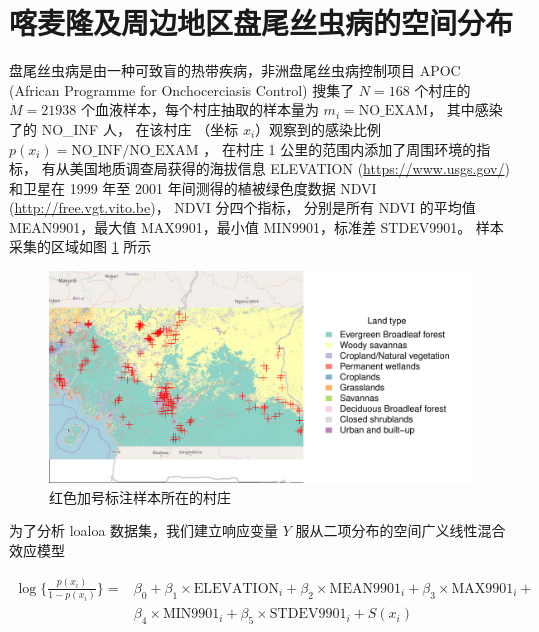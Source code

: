 \documentclass[12pt,a4paper,UTF8,twoside]{book}
\theoremstyle{definition}
\theoremstyle{definition}
\theoremstyle{definition}
\theoremstyle{remark}
\begin{document}
\hypertarget{loaloa}{%
\section{喀麦隆及周边地区盘尾丝虫病的空间分布}\label{loaloa}}

盘尾丝虫病是由一种可致盲的热带疾病，非洲盘尾丝虫病控制项目 APOC (African
Programme for Onchocerciasis Control) 搜集了 \(N=168\) 个村庄的
\(M = 21938\) 个血液样本，每个村庄抽取的样本量为
\(m_i=\mathrm{NO\_EXAM}\)， 其中感染了的 NO\_INF 人， 在该村庄 （坐标
\(x_i\)）观察到的感染比例 \(p(x_i) = \mathrm{NO\_INF/NO\_EXAM}\) ，
在村庄 1 公里的范围内添加了周围环境的指标，
有从美国地质调查局获得的海拔信息 ELEVATION (\url{https://www.usgs.gov/})
和卫星在 1999 年至 2001 年间测得的植被绿色度数据 NDVI
(\url{http://free.vgt.vito.be})， NDVI 分四个指标， 分别是所有 NDVI
的平均值 MEAN9901，最大值 MAX9901，最小值 MIN9901，标准差 STDEV9901。
样本采集的区域如图 \ref{fig:loaloa-map} 所示

\begin{figure}

{\centering \includegraphics[width=0.9\linewidth]{figures/map-loaloa} 

}

\caption{红色加号标注样本所在的村庄}\label{fig:loaloa-map}
\end{figure}

\noindent 为了分析 loaloa 数据集，我们建立响应变量 \(Y\)
服从二项分布的空间广义线性混合效应模型

\begin{equation*}
\begin{split}
\log\big\{ \frac{ p(x_i)}{ 1-p(x_i)} \big\} = 
               & \beta_{0} + \beta_{1} \times \mathrm{ELEVATION}_{i} + \beta_{2} \times \mathrm{MEAN9901}_{i} + \beta_{3} \times \mathrm{MAX9901}_{i} + \\
               & \beta_{4} \times \mathrm{MIN9901}_{i} +  \beta_{5} \times \mathrm{STDEV9901}_{i} + S(x_{i})
\end{split}
\end{equation*}
\end{document}
